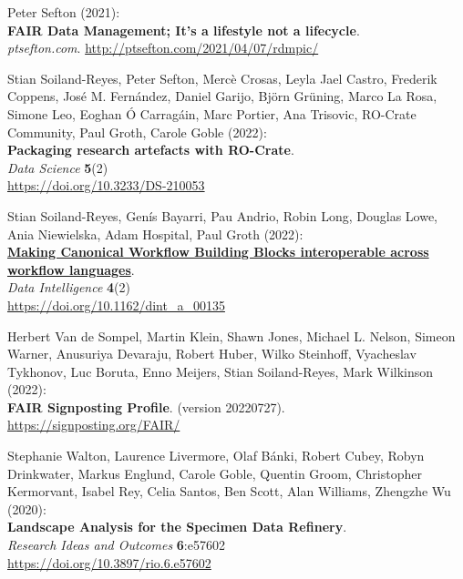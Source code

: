 \begin{thebibliography}{9}
Peter Sefton (2021):\\
\textbf{FAIR Data Management; It's a lifestyle not a lifecycle}.\\
\emph{ptsefton.com}. \url{http://ptsefton.com/2021/04/07/rdmpic/}

Stian Soiland-Reyes, Peter Sefton, Mercè
Crosas, Leyla Jael Castro, Frederik Coppens, José M. Fernández, Daniel
Garijo, Björn Grüning, Marco La Rosa, Simone Leo, Eoghan Ó Carragáin,
Marc Portier, Ana Trisovic, RO-Crate Community, Paul Groth, Carole Goble
(2022):\\
\textbf{Packaging research artefacts with RO-Crate}.\\
\emph{Data Science} \textbf{5}(2)\\
\url{https://doi.org/10.3233/DS-210053}

Stian Soiland-Reyes, Genís Bayarri, Pau
Andrio, Robin Long, Douglas Lowe, Ania Niewielska, Adam Hospital, Paul
Groth (2022):\\
\href{../canonical-workflow-building-blocks/}{\textbf{Making Canonical
Workflow Building Blocks interoperable across workflow languages}}.\\
\emph{Data Intelligence} \textbf{4}(2)\\
\url{https://doi.org/10.1162/dint_a_00135}

Herbert Van de Sompel, Martin Klein, Shawn
Jones, Michael L. Nelson, Simeon Warner, Anusuriya Devaraju, Robert
Huber, Wilko Steinhoff, Vyacheslav Tykhonov, Luc Boruta, Enno Meijers,
Stian Soiland-Reyes, Mark Wilkinson (2022):\\
\textbf{FAIR Signposting Profile}. (version 20220727).\\
\url{https://signposting.org/FAIR/}

Stephanie Walton, Laurence Livermore, Olaf Bánki,
Robert Cubey, Robyn Drinkwater, Markus Englund, Carole Goble, Quentin
Groom, Christopher Kermorvant, Isabel Rey, Celia Santos, Ben Scott, Alan
Williams, Zhengzhe Wu (2020):\\
\textbf{Landscape Analysis for the Specimen Data Refinery}.\\
\emph{Research Ideas and Outcomes} \textbf{6}:e57602\\
\url{https://doi.org/10.3897/rio.6.e57602}


\end{thebibliography}
